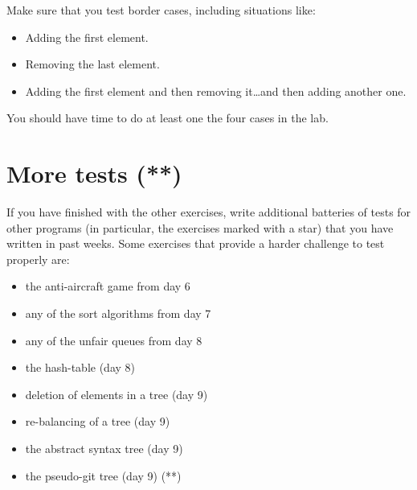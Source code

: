 \documentclass{article}
\begin{document}
Make sure that you test border cases, including situations like: 

\begin{itemize}
\item Adding the first element.
\item Removing the last element.
\item Adding the first element and then removing it\ldots and then
  adding another one.
\end{itemize}

You should have time to do at least one the four cases in the lab.

\section{More tests (**)}
\label{sec:more-tests-}

If you have finished with the other exercises, write additional
batteries of tests for other programs (in particular, the exercises
marked with a star)  that you have written in past
weeks. Some exercises that provide a harder challenge to test properly
are: 

\begin{itemize}
\item the anti-aircraft game from day 6
\item any of the sort algorithms from day 7
\item any of the unfair queues from day 8
\item the hash-table (day 8)
\item deletion of elements in a tree (day 9)
\item re-balancing of a tree (day 9)
\item the abstract syntax tree (day 9)
\item the pseudo-git tree (day 9) (**)
\end{itemize}
\end{document}

